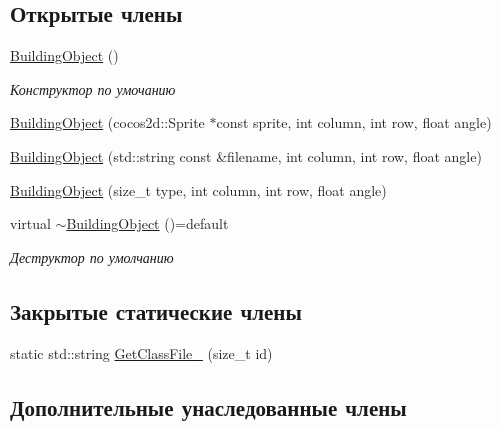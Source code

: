 \subsection*{Открытые члены}
\begin{DoxyCompactItemize}
\item 
\mbox{\label{classrtm_1_1_building_object_a03e7024f6e30929fd991bd811d6a7766}} 
\hyperlink{classrtm_1_1_building_object_a03e7024f6e30929fd991bd811d6a7766}{Building\+Object} ()
\begin{DoxyCompactList}\small\item\em Конструктор по умочанию \end{DoxyCompactList}\item 
\hyperlink{classrtm_1_1_building_object_a972c352ad972bec2381137299a95045c}{Building\+Object} (cocos2d\+::\+Sprite $\ast$const sprite, int column, int row, float angle)
\item 
\hyperlink{classrtm_1_1_building_object_a8507652023a31117c99593625011a456}{Building\+Object} (std\+::string const \&filename, int column, int row, float angle)
\item 
\hyperlink{classrtm_1_1_building_object_a3785e78d68f62e698013091d436e943d}{Building\+Object} (size\+\_\+t type, int column, int row, float angle)
\item 
\mbox{\label{classrtm_1_1_building_object_a6c339422b4b701fb1e3208ad4a9f737a}} 
virtual \hyperlink{classrtm_1_1_building_object_a6c339422b4b701fb1e3208ad4a9f737a}{$\sim$\+Building\+Object} ()=default
\begin{DoxyCompactList}\small\item\em Деструктор по умолчанию \end{DoxyCompactList}\end{DoxyCompactItemize}
\subsection*{Закрытые статические члены}
\begin{DoxyCompactItemize}
\item 
static std\+::string \hyperlink{classrtm_1_1_building_object_a03d48aa04f03da02b6a006b7a888dca5}{Get\+Class\+File\+\_\+} (size\+\_\+t id)
\end{DoxyCompactItemize}
\subsection*{Дополнительные унаследованные члены}


